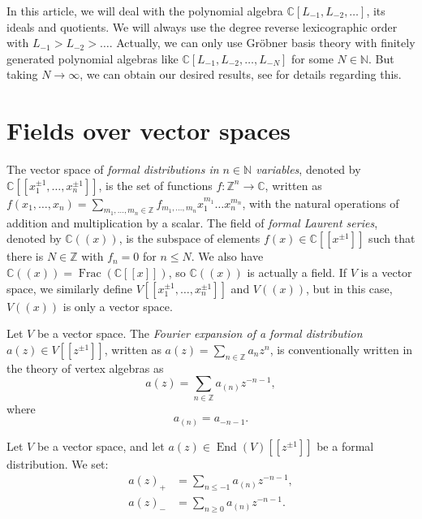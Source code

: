 \documentclass[a4paper, 12pt, reqno]{amsart}
\theoremstyle{remark}
\DeclareMathOperator{\Frac}{Frac}
\DeclareMathOperator{\End}{End}
\begin{document}
In this article, we will deal with the polynomial algebra $\mathbb{C}[L_{-1}, L_{-2}, \dots]$, its ideals and quotients.
We will always use the degree reverse lexicographic order with $L_{-1} > L_{-2} > \dots$.
Actually, we can only use Gröbner basis theory with finitely generated polynomial algebras like $\mathbb{C}[L_{-1}, L_{-2}, \dots, L_{-N}]$ for some $N \in \mathbb{N}$.
But taking $N \to \infty$, we can obtain our desired results, see \cite{salazar_pbw_2024} for details regarding this.

\section{Fields over vector spaces}
\label{sec:fields-over-vector}

The vector space of \emph{formal distributions in $n \in \mathbb{N}$ variables}, denoted by $\mathbb{C}[[x_1^{\pm1}, \dots, x_n^{\pm1}]]$, is the set of functions $f: \mathbb{Z}^n \to \mathbb{C}$, written as $f(x_1, \dots, x_n) = \sum_{m_1, \dots, m_n \in \mathbb{Z}}f_{m_1, \dots, m_n}x_1^{m_1}\dots x_n^{m_n}$, with the natural operations of addition and multiplication by a scalar.
The field of \emph{formal Laurent series}, denoted by $\mathbb{C}((x))$, is the subspace of elements $f(x) \in \mathbb{C}[[x^{\pm1}]]$ such that there is $N \in \mathbb{Z}$ with $f_n = 0$ for $n \le N$.
We also have $\mathbb{C}((x)) = \Frac(\mathbb{C}[[x]])$, so $\mathbb{C}((x))$ is actually a field.
If $V$ is a vector space, we similarly define $V[[x_1^{\pm1}, \dots, x_n^{\pm1}]]$ and $V((x))$, but in this case, $V((x))$ is only a vector space.

Let $V$ be a vector space.
The \emph{Fourier expansion of a formal distribution $a(z) \in V[[z^{\pm1}]]$}, written as $a(z) = \sum_{n \in \mathbb{Z}}a_nz^n$, is conventionally written in the theory of vertex algebras as
\begin{equation*}
  a(z) = \sum_{n \in \mathbb{Z}}a_{(n)}z^{-n - 1},
\end{equation*}
where
\begin{equation*}
  a_{(n)} = a_{-n - 1}.
\end{equation*}

Let $V$ be a vector space, and let $a(z) \in \End(V)[[z^{\pm1}]]$ be a formal distribution.
We set:
\begin{align*}
  a(z)_+ &= \sum_{n \le -1}a_{(n)}z^{-n - 1}, \\
  a(z)_- &= \sum_{n \ge 0}a_{(n)}z^{-n - 1}.
\end{align*}
\end{document}
